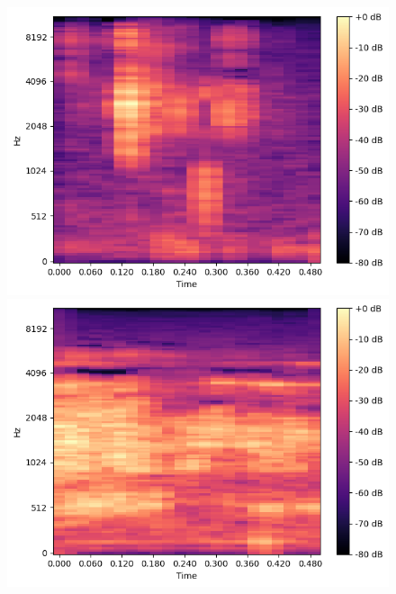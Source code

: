 \begin{figure}[t]
    \centering

    \begin{minipage}[b]{0.3\hsize}
        \centering
        \includegraphics[width=\hsize]{img/melspec/rice.png}
    \end{minipage}
    \begin{minipage}[b]{0.3\hsize}
        \centering
        \includegraphics[width=\hsize]{img/melspec/soup.png}
    \end{minipage}
    \begin{minipage}[b]{0.3\hsize}
        \centering

\end{minipage}
\end{figure}
